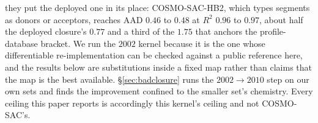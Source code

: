 they put the deployed one in its place: COSMO-SAC-HB2, which types segments as donors or acceptors,
reaches AAD $0.46$ to $0.48$ at $R^2$ $0.96$ to $0.97$, about half the deployed closure's $0.77$ and
a third of the $1.75$ that anchors the profile-database bracket. We run the $2002$ kernel
because it is the one whose differentiable re-implementation can be checked against a public
reference here, and the results below are substitutions inside a fixed map rather than claims that
the map is the best available. \S\ref{sec:badclosure} runs the $2002\to2010$ step on our own
sets and finds the improvement confined to the smaller set's chemistry. Every ceiling this paper
reports is accordingly this kernel's ceiling and not COSMO-SAC's.

%
